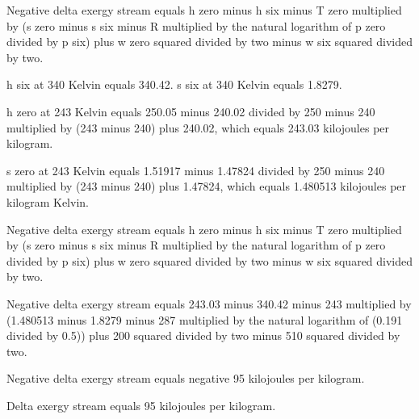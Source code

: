 Negative delta exergy stream equals h zero minus h six minus T zero multiplied by (s zero minus s six minus R multiplied by the natural logarithm of p zero divided by p six) plus w zero squared divided by two minus w six squared divided by two.  

h six at 340 Kelvin equals 340.42.  
s six at 340 Kelvin equals 1.8279.  

h zero at 243 Kelvin equals 250.05 minus 240.02 divided by 250 minus 240 multiplied by (243 minus 240) plus 240.02, which equals 243.03 kilojoules per kilogram.  

s zero at 243 Kelvin equals 1.51917 minus 1.47824 divided by 250 minus 240 multiplied by (243 minus 240) plus 1.47824, which equals 1.480513 kilojoules per kilogram Kelvin.  

Negative delta exergy stream equals h zero minus h six minus T zero multiplied by (s zero minus s six minus R multiplied by the natural logarithm of p zero divided by p six) plus w zero squared divided by two minus w six squared divided by two.  

Negative delta exergy stream equals 243.03 minus 340.42 minus 243 multiplied by (1.480513 minus 1.8279 minus 287 multiplied by the natural logarithm of (0.191 divided by 0.5)) plus 200 squared divided by two minus 510 squared divided by two.  

Negative delta exergy stream equals negative 95 kilojoules per kilogram.  

Delta exergy stream equals 95 kilojoules per kilogram.